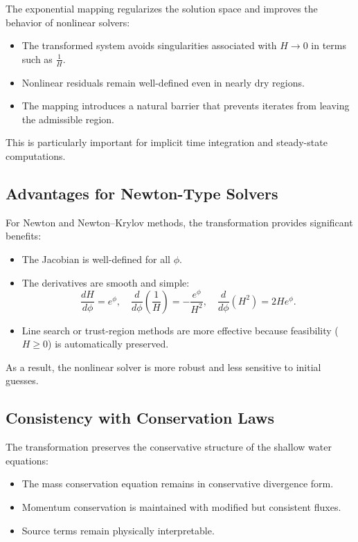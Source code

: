 \documentclass[11pt]{article}
\begin{document}
The exponential mapping regularizes the solution space and improves the behavior of nonlinear solvers:
\begin{itemize}[leftmargin=2em]
    \item The transformed system avoids singularities associated with $H \to 0$ in terms such as $\frac{1}{H}$.
    \item Nonlinear residuals remain well-defined even in nearly dry regions.
    \item The mapping introduces a natural barrier that prevents iterates from leaving the admissible region.
\end{itemize}

This is particularly important for implicit time integration and steady-state computations.

\subsection{Advantages for Newton-Type Solvers}

For Newton and Newton--Krylov methods, the transformation provides significant benefits:
\begin{itemize}[leftmargin=2em]
    \item The Jacobian is well-defined for all $\phi$.
    \item The derivatives are smooth and simple:
    \[
    \frac{dH}{d\phi} = e^{\phi}, \quad
    \frac{d}{d\phi}\left(\frac{1}{H}\right) = -\frac{e^{\phi}}{H^2}, \quad
    \frac{d}{d\phi}(H^2) = 2H e^{\phi}.
    \]
    \item Line search or trust-region methods are more effective because feasibility ($H \ge 0$) is automatically preserved.
\end{itemize}

As a result, the nonlinear solver is more robust and less sensitive to initial guesses.

\subsection{Consistency with Conservation Laws}

The transformation preserves the conservative structure of the shallow water equations:
\begin{itemize}[leftmargin=2em]
    \item The mass conservation equation remains in conservative divergence form.
    \item Momentum conservation is maintained with modified but consistent fluxes.
    \item Source terms remain physically interpretable.
\end{itemize}
\end{document}
